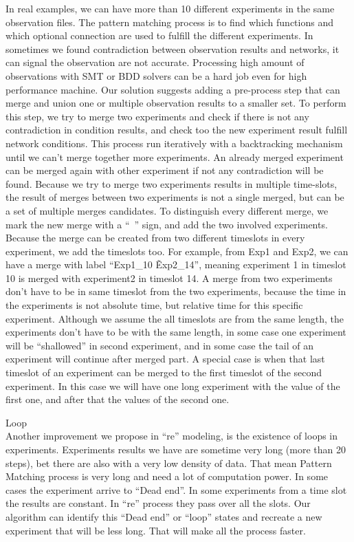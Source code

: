 \documentclass{article}      %
\newcounter{ct}
\begin{document}
In real examples, we can have more than 10 different experiments in the same observation files. The pattern matching process is to find which functions and which optional connection are used to fulfill the different experiments. In sometimes we found contradiction between observation results and networks, it can signal the observation are not accurate. 
Processing high amount of observations with SMT or BDD solvers can be a hard job even for high performance machine.
Our solution suggests adding a pre-process step that can merge and union one or multiple observation results to a smaller set. To perform this step, we try to merge two experiments and check if there is not any contradiction in condition results, and check too the new experiment result fulfill network conditions. This process run iteratively with a backtracking mechanism until we can’t merge together more experiments. An already merged experiment can be merged again with other experiment if not any contradiction will be found. Because we try to merge two experiments results in multiple time-slots, the result of merges between two experiments is not a single merged, but can be a set of multiple merges candidates. To distinguish every different merge, we mark the new merge with a “~” sign, and add the two involved experiments. Because the merge can be created from two different timeslots in every experiment, we add the timeslots too. For example, from Exp1 and Exp2, we can have a merge with label “Exp1\_10 \~ Exp2\_14”, meaning experiment 1 in timeslot 10 is merged with experiment2 in timeslot 14.
A merge from two experiments don’t have to be in same timeslot from the two experiments, because the time in the experiments is not absolute time, but relative time for this specific experiment. Although we assume the all timeslots are from the same length, the experiments don’t have to be with the same length, in some case one experiment will be “shallowed” in second experiment, and in some case the tail of an experiment will continue after merged part. A special case is when that last timeslot of an experiment can be merged to the first timeslot of the second experiment. In this case we will have one long experiment with the value of the first one, and after that the values of the second one.

\large Loop \\
Another improvement we propose in “re” modeling, is the existence of loops in experiments. Experiments results we have are sometime very long (more than 20 steps), bet there are also with a very low density of data.  That mean Pattern Matching process is very long and need a lot of computation power. In some cases the experiment arrive to “Dead end”. In some experiments from a time slot the results are constant. In “re” process they pass over all the slots. Our algorithm can identify this “Dead end” or “loop” states and recreate a new experiment that will be less long. That will make all the process faster.
\end{document}
